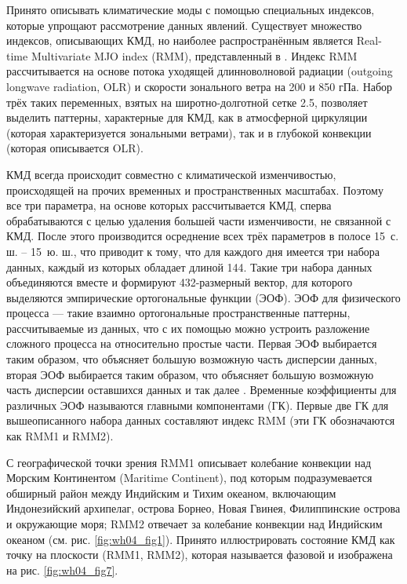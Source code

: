 
Принято описывать климатические моды с помощью специальных индексов, которые упрощают рассмотрение данных явлений. Существует множество индексов, описывающих КМД, но наиболее распространённым является Real-time Multivariate MJO index (RMM), представленный в \cite{Wheeler_Hendon_2004}. Индекс RMM рассчитывается на основе потока уходящей длинноволновой радиации (outgoing longwave radiation, OLR) и скорости зонального ветра на 200 и 850 гПа. Набор трёх таких переменных, взятых на широтно-долготной сетке 2.5\textdegree{}\textdegree, позволяет выделить паттерны, характерные для КМД, как в атмосферной циркуляции (которая характеризуется зональными ветрами), так и в глубокой конвекции (которая описывается OLR).

КМД всегда происходит совместно с климатической изменчивостью, происходящей на прочих временных и пространственных масштабах. Поэтому все три параметра, на основе которых рассчитывается КМД, сперва обрабатываются с целью удаления большей части изменчивости, не связанной с КМД. После этого производится осреднение всех трёх параметров в полосе 15\textdegree\ с. ш. – 15\textdegree\ ю. ш., что приводит к тому, что для каждого дня имеется три набора данных, каждый из которых обладает длиной 144. Такие три набора данных объединяются вместе и формируют 432-размерный вектор, для которого выделяются эмпирические ортогональные функции (ЭОФ). ЭОФ для физического процесса --- такие взаимно ортогональные пространственные паттерны, рассчитываемые из данных, что с их помощью можно устроить разложение сложного процесса на относительно простые части. Первая ЭОФ выбирается таким образом, что объясняет большую возможную часть дисперсии данных, вторая ЭОФ выбирается таким образом, что объясняет большую возможную часть дисперсии оставшихся данных и так далее \cite[Гл. 6]{Zhang_et_al_2020}. Временные коэффициенты для различных ЭОФ называются главными компонентами (ГК). Первые две ГК для вышеописанного набора данных составляют индекс RMM (эти ГК обозначаются как RMM1 и RMM2).

С географической точки зрения RMM1 описывает колебание конвекции над Морским Континентом (Maritime Continent), под которым подразумевается обширный район между Индийским и Тихим океаном, включающим Индонезийский архипелаг, острова Борнео, Новая Гвинея, Филиппинские острова и окружающие моря; RMM2 отвечает за колебание конвекции над Индийским океаном (см. рис. \ref{fig:wh04_fig1}). Принято иллюстрировать состояние КМД как точку на плоскости (RMM1, RMM2), которая называется фазовой и изображена на рис. \ref{fig:wh04_fig7}.

